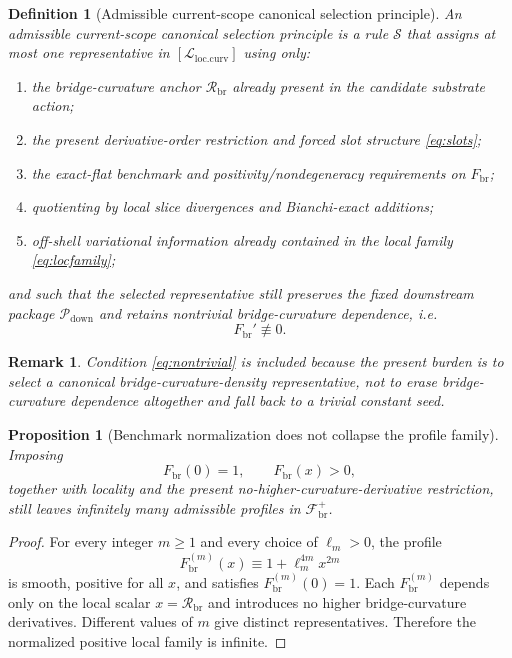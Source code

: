 \documentclass[11pt]{article}
\newcommand{\CurvProfile}{F_{\mathrm{br}}}
\newcommand{\BridgeCurv}{\mathcal R_{\mathrm{br}}}
\newcommand{\CurvFamily}{\mathscr F_{\mathrm{br}}^{+}}
\newcommand{\CurvQuot}{[\mathcal L_{\mathrm{loc.curv}}]}
\newcommand{\DownPkg}{\mathscr P_{\mathrm{down}}}
\newcommand{\SelRule}{\mathscr S}
\newtheorem{definition}{Definition}
\newtheorem{proposition}{Proposition}
\newtheorem{remark}{Remark}
\begin{document}
\begin{definition}[Admissible current-scope canonical selection principle]
\label{def:admissible}
An \emph{admissible current-scope canonical selection principle} is a rule \(\SelRule\) that assigns at most one representative in \(\CurvQuot\) using only:
\begin{enumerate}
    \item the bridge-curvature anchor \(\BridgeCurv\) already present in the candidate substrate action;
    \item the present derivative-order restriction and forced slot structure \eqref{eq:slots};
    \item the exact-flat benchmark and positivity/nondegeneracy requirements on \(\CurvProfile\);
    \item quotienting by local slice divergences and Bianchi-exact additions;
    \item off-shell variational information already contained in the local family \eqref{eq:locfamily};
\end{enumerate}
and such that the selected representative still preserves the fixed downstream package \(\DownPkg\) and retains nontrivial bridge-curvature dependence, i.e.
\begin{equation}
\CurvProfile' \not\equiv 0.
\label{eq:nontrivial}
\end{equation}
\end{definition}

\begin{remark}
Condition \eqref{eq:nontrivial} is included because the present burden is to select a canonical \emph{bridge-curvature-density} representative, not to erase bridge-curvature dependence altogether and fall back to a trivial constant seed.
\end{remark}

\begin{proposition}[Benchmark normalization does not collapse the profile family]
\label{prop:normalization}
Imposing
\begin{equation}
\CurvProfile(0)=1,
\qquad
\CurvProfile(x)>0,
\label{eq:bench}
\end{equation}
together with locality and the present no-higher-curvature-derivative restriction, still leaves infinitely many admissible profiles in \(\CurvFamily\).
\end{proposition}

\begin{proof}
For every integer \(m\geq1\) and every choice of \(\ell_m>0\), the profile
\begin{equation}
\CurvProfile^{(m)}(x)\equiv 1+\ell_m^{4m}x^{2m}
\label{eq:familym}
\end{equation}
is smooth, positive for all \(x\), and satisfies \(\CurvProfile^{(m)}(0)=1\). Each \(\CurvProfile^{(m)}\) depends only on the local scalar \(x=\BridgeCurv\) and introduces no higher bridge-curvature derivatives. Different values of \(m\) give distinct representatives. Therefore the normalized positive local family is infinite.
\end{proof}
\end{document}
